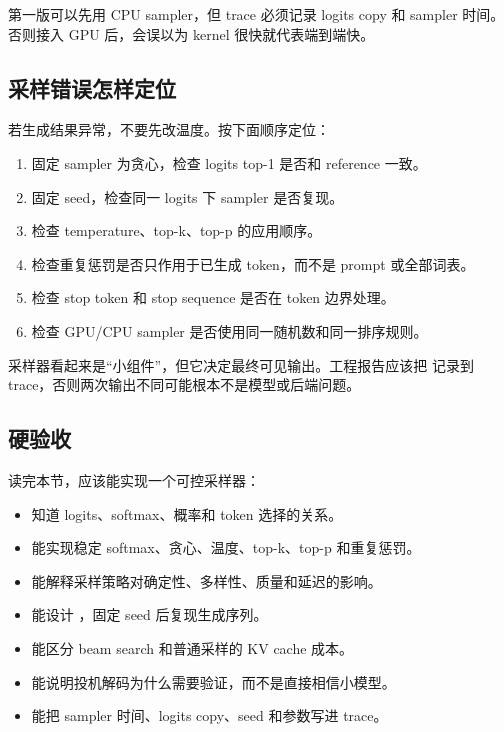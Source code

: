 第一版可以先用 CPU sampler，但 trace 必须记录 logits copy 和 sampler 时间。否则接入 GPU 后，会误以为 kernel 很快就代表端到端快。

\subsection{采样错误怎样定位}

若生成结果异常，不要先改温度。按下面顺序定位：

\begin{enumerate}
  \item 固定 sampler 为贪心，检查 logits top-1 是否和 reference 一致。
  \item 固定 seed，检查同一 logits 下 sampler 是否复现。
  \item 检查 temperature、top-k、top-p 的应用顺序。
  \item 检查重复惩罚是否只作用于已生成 token，而不是 prompt 或全部词表。
  \item 检查 stop token 和 stop sequence 是否在 token 边界处理。
  \item 检查 GPU/CPU sampler 是否使用同一随机数和同一排序规则。
\end{enumerate}

采样器看起来是“小组件”，但它决定最终可见输出。工程报告应该把  记录到 trace，否则两次输出不同可能根本不是模型或后端问题。

\subsection{硬验收}

读完本节，应该能实现一个可控采样器：

\begin{itemize}
  \item 知道 logits、softmax、概率和 token 选择的关系。
  \item 能实现稳定 softmax、贪心、温度、top-k、top-p 和重复惩罚。
  \item 能解释采样策略对确定性、多样性、质量和延迟的影响。
  \item 能设计 ，固定 seed 后复现生成序列。
  \item 能区分 beam search 和普通采样的 KV cache 成本。
  \item 能说明投机解码为什么需要验证，而不是直接相信小模型。
  \item 能把 sampler 时间、logits copy、seed 和参数写进 trace。
\end{itemize}
